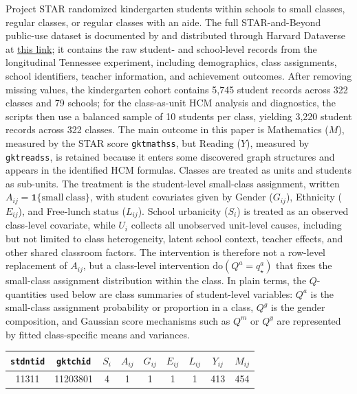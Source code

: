 \documentclass[unnumsec,webpdf,contemporary,large]{oup-authoring-template}%
\theoremstyle{thmstyleone}%
\theoremstyle{thmstyletwo}%
\theoremstyle{thmstylethree}%
\newcommand{\rmdo}{\mathrm{do}}
\begin{document}
Project STAR randomized kindergarten students within schools to small classes, regular classes, or regular classes with an aide.
The full STAR-and-Beyond public-use dataset is documented by \citet{Achilles2008} and distributed through Harvard Dataverse at \href{https://doi.org/10.7910/DVN/SIWH9F}{this link}; it contains the raw student- and school-level records from the longitudinal Tennessee experiment, including demographics, class assignments, school identifiers, teacher information, and achievement outcomes.
After removing missing values, the kindergarten cohort contains 5,745 student records across 322 classes and 79 schools; for the class-as-unit HCM analysis and diagnostics, the scripts then use a balanced sample of 10 students per class, yielding 3,220 student records across 322 classes.
The main outcome in this paper is Mathematics ($M$), measured by the STAR score \texttt{gktmathss}, but Reading ($Y$), measured by \texttt{gktreadss}, is retained because it enters some discovered graph structures and appears in the identified HCM formulas.
Classes are treated as units and students as sub-units.
The treatment is the student-level small-class assignment, written $A_{ij}=\mathbf 1\{\mathrm{small\ class}\}$, with student covariates given by Gender ($G_{ij}$), Ethnicity ($E_{ij}$), and Free-lunch status ($L_{ij}$).
School urbanicity ($S_i$) is treated as an observed class-level covariate, while $U_i$ collects all unobserved unit-level causes, including but not limited to class heterogeneity, latent school context, teacher effects, and other shared classroom factors.
The intervention is therefore not a row-level replacement of $A_{ij}$, but a class-level intervention $\rmdo(Q^a=q_\star^a)$ that fixes the small-class assignment distribution within the class.
In plain terms, the $Q$-quantities used below are class summaries of student-level variables: $Q^a$ is the small-class assignment probability or proportion in a class, $Q^g$ is the gender composition, and Gaussian score mechanisms such as $Q^m$ or $Q^y$ are represented by fitted class-specific means and variances.

\begin{center}
\centering
\scriptsize
\begin{tabular}{ccccccccc}
\toprule
\texttt{stdntid} & \texttt{gktchid} & $S_i$ & $A_{ij}$ & $G_{ij}$ & $E_{ij}$ & $L_{ij}$ & $Y_{ij}$ & $M_{ij}$ \\
\midrule
11311 & 11203801 & 4 & 1 & 1 & 1 & 1 & 413 & 454 \\
\bottomrule
\end{tabular}
\label{tab:star-example-row}
\end{center}
\end{document}
